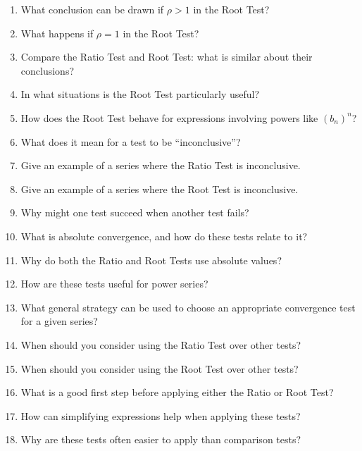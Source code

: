 \begin{enumerate}
\item What conclusion can be drawn if $\rho > 1$ in the Root Test?

\item What happens if $\rho = 1$ in the Root Test?

\item Compare the Ratio Test and Root Test: what is similar about their conclusions?

\item In what situations is the Root Test particularly useful?

\item How does the Root Test behave for expressions involving powers like $(b_n)^n$?

\item What does it mean for a test to be “inconclusive”?

\item Give an example of a series where the Ratio Test is inconclusive.

\item Give an example of a series where the Root Test is inconclusive.

\item Why might one test succeed when another test fails?

\item What is absolute convergence, and how do these tests relate to it?

\item Why do both the Ratio and Root Tests use absolute values?

\item How are these tests useful for power series?

\item What general strategy can be used to choose an appropriate convergence test for a given series?

\item When should you consider using the Ratio Test over other tests?

\item When should you consider using the Root Test over other tests?

\item What is a good first step before applying either the Ratio or Root Test?

\item How can simplifying expressions help when applying these tests?

\item Why are these tests often easier to apply than comparison tests?


\end{enumerate}

